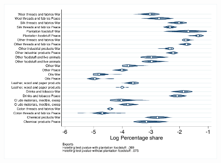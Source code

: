 \documentclass[12pt,a4paper,notitlepage,english]{article}
\begin{document}
\begin{figure}
\includegraphics[scale=.63]{pre_independence_distribution_X}
\end{figure}


\end{document}
